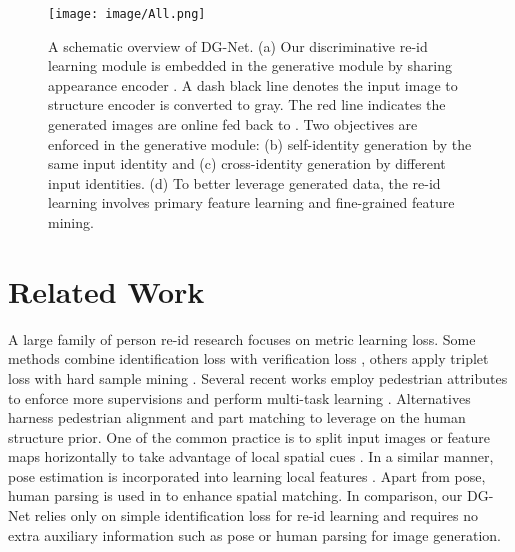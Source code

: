 \documentclass[10pt,twocolumn,letterpaper]{article}
\begin{document}
\begin{figure*}[t]
\begin{center}
\texttt{[image: image/All.png]}
\end{center}
\vspace{-.23in}
  \caption{ 
  A schematic overview of DG-Net. (a) Our discriminative re-id learning module is embedded in the generative module by sharing appearance encoder . A dash black line denotes the input image to structure encoder  is converted to gray. The red line indicates the generated images are online fed back to . Two objectives are enforced in the generative module: (b) self-identity generation by the same input identity and (c) cross-identity generation by different input identities. (d) To better leverage generated data, the re-id learning involves primary feature learning and fine-grained feature mining.
}
\label{fig:refine}
\end{figure*}

\section{Related Work}

A large family of person re-id research focuses on metric learning loss. Some methods combine identification loss with verification loss \cite{zheng2016discriminatively, wu2018and}, others apply triplet loss with hard sample mining \cite{hermans2017defense, ristani2018features, cheng2016person}. 
Several recent works employ pedestrian attributes to enforce more supervisions and perform multi-task learning \cite{lin2017improving, su2016deep, wang2018transferable}. 
Alternatives harness pedestrian alignment and part matching to leverage on the human structure prior. One of the common practice is to split input images or feature maps horizontally to take advantage of local spatial cues \cite{yi2014deep,li2017person,sun2017beyond}. In a similar manner, pose estimation is incorporated into learning local features \cite{su2017pose, zhao2017spindle, wei2017glad, suh2018part,zheng2018pedestrian}. Apart from pose, human parsing is used in \cite{kalayeh2018human} to enhance spatial matching. In comparison, our DG-Net relies only on simple identification loss for re-id learning and requires no extra auxiliary information such as pose or human parsing for image generation.    
\end{document}
